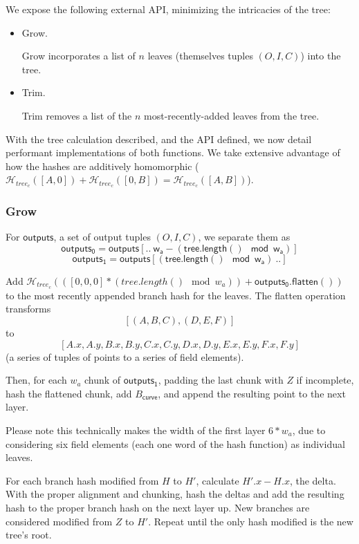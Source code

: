 \documentclass[]{article}
\begin{document}
We expose the following external API, minimizing the intricacies of the tree:

\begin{itemize}
  \item Grow.
  
  Grow incorporates a list of $n$ leaves (themselves tuples $(O, I, C)$) into the tree.
  \item Trim.

  Trim removes a list of the $n$ most-recently-added leaves from the tree.
\end{itemize}

With the tree calculation described, and the API defined, we now detail performant implementations of both functions. We take extensive advantage of how the hashes are additively homomorphic ($\mathcal{H}_{tree_c}([A, 0]) + \mathcal{H}_{tree_c}([0, B]) = \mathcal{H}_{tree_c}([A, B])$).

\subsubsection{Grow}

For $\mathsf{outputs}$, a set of output tuples $(O, I, C)$, we separate them as
$$
\mathsf{outputs_0} = \mathsf{outputs[.. ~w_a - (tree.length() \mod w_a)]}
$$
$$
\mathsf{outputs_1} = \mathsf{outputs[(tree.length() \mod w_a) ~..]}
$$

Add $\mathcal{H}_{tree_c}(([0, 0, 0] * (tree.length() \mod w_a)) + \mathsf{outputs_0.flatten()})$ to the most recently appended branch hash for the leaves. The flatten operation transforms $$[(A, B, C), (D, E, F)]$$ to $$[
A.x, A.y, B.x, B.y, C.x, C.y,
D.x, D.y, E.x, E.y, F.x, F.y
]$$
(a series of tuples of points to a series of field elements).

Then, for each $w_a$ chunk of $\mathsf{outputs_1}$, padding the last chunk with $Z$ if incomplete, hash the flattened chunk, add $B_{\mathsf{curve}}$, and append the resulting point to the next layer.

Please note this technically makes the width of the first layer $6 * w_a$, due to considering six field elements (each one word of the hash function) as individual leaves.

For each branch hash modified from $H$ to $H'$, calculate $H'.x - H.x$, the delta. With the proper alignment and chunking, hash the deltas and add the resulting hash to the proper branch hash on the next layer up. New branches are considered modified from $Z$ to $H'$. Repeat until the only hash modified is the new tree's root.
\end{document}
